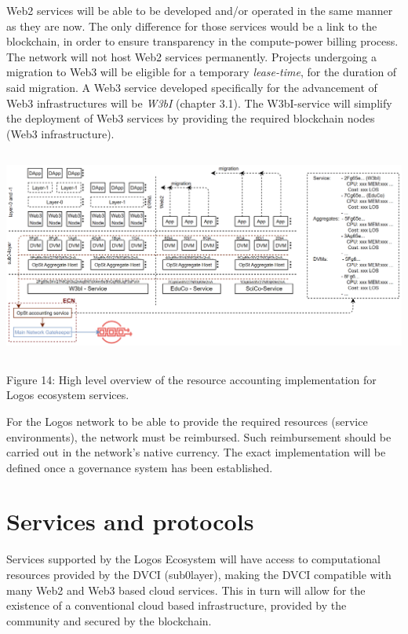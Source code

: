 \documentclass[]{article}
\begin{document}
Web2 services will be able to be developed and/or operated in the same manner as they are now. 
The only difference for those services would be a link to the blockchain, in order to ensure transparency in the compute-power billing process.
The network will not host Web2 services permanently.
Projects undergoing a migration to Web3 will be eligible for a temporary \textit{lease-time}, for the duration of said migration.
A Web3 service developed specifically for the advancement of Web3 infrastructures will be \textit{W3bI} (chapter 3.1).
The W3bI-service will simplify the deployment of Web3 services by providing the required blockchain nodes (Web3 infrastructure).

\begin{center}
	\includegraphics[height=6.9cm]{logos-network-services}
\end{center}
\begin{center}
	Figure 14: High level overview of the resource accounting implementation for Logos ecosystem services.
\end{center}

For the Logos network to be able to provide the required resources (service environments), the network must be reimbursed.
Such reimbursement should be carried out in the network's native currency.
The exact implementation will be defined once a governance system has been established. 

\section{Services and protocols}
Services supported by the Logos Ecosystem will have access to computational resources provided by the DVCI (sub0layer), making the DVCI compatible with many Web2 and Web3 based cloud services.
This in turn will allow for the existence of a conventional cloud based infrastructure, provided by the community and secured by the blockchain.
\end{document}
